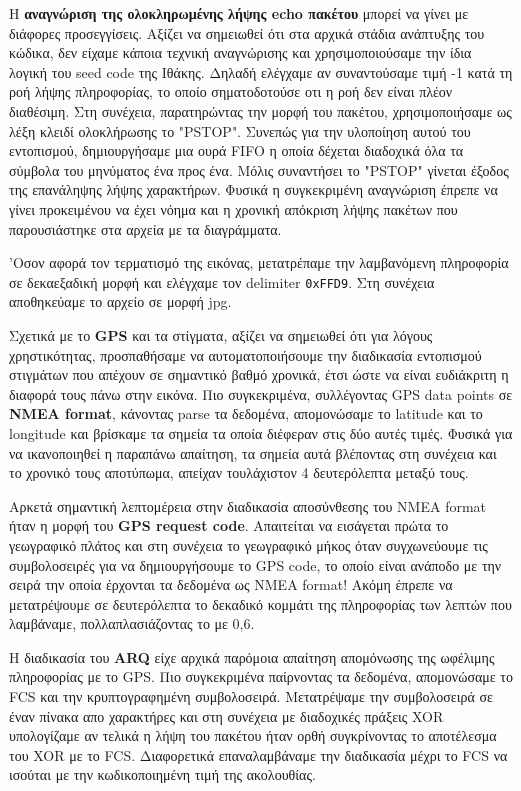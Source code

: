 \documentclass[hidelinks, 12pt, a4paper]{article}
\begin{document}
Η \textbf{αναγνώριση της ολοκληρωμένης λήψης echo πακέτου} μπορεί να γίνει με διάφορες προσεγγίσεις. Αξίζει να σημειωθεί ότι στα αρχικά στάδια ανάπτυξης του κώδικα, δεν είχαμε κάποια τεχνική αναγνώρισης και χρησιμοποιούσαμε την ίδια λογική του seed code της Ιθάκης. Δηλαδή ελέγχαμε αν συναντούσαμε τιμή -1 κατά τη ροή λήψης πληροφορίας, το οποίο σηματοδοτούσε οτι η ροή δεν είναι πλέον διαθέσιμη. Στη συνέχεια, παρατηρώντας την μορφή του πακέτου, χρησιμοποιήσαμε ως λέξη κλειδί ολοκλήρωσης το "PSTOP". Συνεπώς για την υλοποίηση αυτού του εντοπισμού, δημιουργήσαμε μια ουρά FIFO η οποία δέχεται διαδοχικά όλα τα σύμβολα του μηνύματος ένα προς ένα. Μόλις συναντήσει το "PSTOP" γίνεται έξοδος της επανάληψης λήψης χαρακτήρων. Φυσικά η συγκεκριμένη αναγνώριση έπρεπε να γίνει προκειμένου να έχει νόημα και η χρονική απόκριση λήψης πακέτων που παρουσιάστηκε στα αρχεία με τα διαγράμματα.

'Οσον αφορά τον τερματισμό της εικόνας, μετατρέπαμε την λαμβανόμενη πληροφορία σε δεκαεξαδική μορφή και ελέγχαμε τον delimiter \verb|0xFFD9|. Στη συνέχεια αποθηκεύαμε το αρχείο σε μορφή jpg.

Σχετικά με το \textbf{GPS} και τα στίγματα, αξίζει να σημειωθεί ότι για λόγους χρηστικότητας, προσπαθήσαμε να αυτοματοποιήσουμε την διαδικασία εντοπισμού στιγμάτων που απέχουν σε σημαντικό βαθμό χρονικά, έτσι ώστε να είναι ευδιάκριτη η διαφορά τους πάνω στην εικόνα. Πιο συγκεκριμένα, συλλέγοντας GPS data points σε \textbf{NMEA format}, κάνοντας parse τα δεδομένα, απομονώσαμε το latitude και το longitude και βρίσκαμε τα σημεία τα οποία διέφεραν στις δύο αυτές τιμές. Φυσικά για να ικανοποιηθεί η παραπάνω απαίτηση, τα σημεία αυτά βλέποντας στη συνέχεια και το χρονικό τους αποτύπωμα, απείχαν τουλάχιστον 4 δευτερόλεπτα μεταξύ τους.

Αρκετά σημαντική λεπτομέρεια στην διαδικασία αποσύνθεσης του NMEA format ήταν η μορφή του \textbf{GPS request code}. Απαιτείται να εισάγεται πρώτα το γεωγραφικό πλάτος και στη συνέχεια το γεωγραφικό μήκος όταν συγχωνεύουμε τις συμβολοσειρές για να δημιουργήσουμε το GPS code, το οποίο είναι ανάποδο με την σειρά την οποία έρχονται τα δεδομένα ως NMEA format! Ακόμη έπρεπε να μετατρέψουμε σε δευτερόλεπτα το δεκαδικό κομμάτι της πληροφορίας των λεπτών που λαμβάναμε, πολλαπλασιάζοντας το με 0,6.

Η διαδικασία του \textbf{ARQ} είχε αρχικά παρόμοια απαίτηση απομόνωσης της ωφέλιμης πληροφορίας με το GPS. Πιο συγκεκριμένα παίρνοντας τα δεδομένα, απομονώσαμε το FCS και την κρυπτογραφημένη συμβολοσειρά. Μετατρέψαμε την συμβολοσειρά σε έναν πίνακα απο χαρακτήρες και στη συνέχεια με διαδοχικές πράξεις XOR υπολογίζαμε αν τελικά η λήψη του πακέτου ήταν ορθή συγκρίνοντας το αποτέλεσμα του XOR με το FCS. Διαφορετικά επαναλαμβάναμε την διαδικασία μέχρι το FCS να ισούται με την κωδικοποιημένη τιμή της ακολουθίας.
\end{document}
